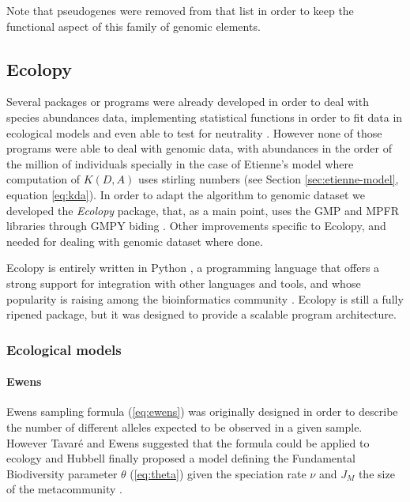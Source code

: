 Note that pseudogenes were removed from that list in order to keep the functional aspect of this family of genomic elements.

\subsection{Ecolopy}

Several packages or programs were already developed in order to deal with species abundances data, implementing statistical functions in order to fit data in ecological models and even able to test for neutrality \cite{Jabot2011,Etienne2007,Hankin2007}. However none of those programs were able to deal with genomic data, with abundances in the order of the million of individuals specially in the case of Etienne's model where computation of $K(D,A)$ uses stirling numbers (see Section \ref{sec:etienne-model}, equation \ref{eq:kda}). In order to adapt the algorithm to genomic dataset we developed the \textit{Ecolopy} package, that, as a main point, uses the GMP \cite{Granlund2000} and MPFR \cite{Fousse2007} libraries through GMPY biding \cite{Martelli2007}. Other improvements specific to Ecolopy, and needed for dealing with genomic dataset where done.

Ecolopy is entirely written in Python \cite{VanRossum1991}, a programming language that offers a strong support for integration with other languages and tools, and whose popularity is raising among the bioinformatics community \cite{Bassi2007}. Ecolopy is still a fully ripened package, but it was designed to provide a scalable program architecture.

\subsubsection{Ecological models}

\paragraph{Ewens} 
\label{sec:ewens-model}

Ewens sampling formula \cite{Ewens1972} (\ref{eq:ewens}) was originally designed in order to describe the number of different alleles expected to be observed in a given sample. However Tavar\'e and Ewens suggested that the formula could be applied to ecology \cite{Tavari1997} and Hubbell finally proposed a model defining the Fundamental Biodiversity parameter $\theta$ (\ref{eq:theta}) given the speciation rate $\nu$ and $J_M$ the size of the metacommunity \cite{Hubbell2001}.

